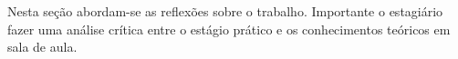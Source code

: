 Nesta seção abordam-se as reflexões sobre o trabalho. Importante o estagiário
fazer uma análise crítica entre o estágio prático e os conhecimentos teóricos
em sala de aula.

\textopadrao

\textopadrao
